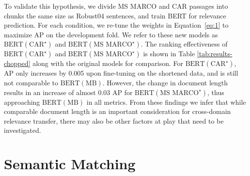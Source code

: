 To validate this hypothesis, we divide MS MARCO and CAR passages into chunks the same size as Robust04 sentences, and train BERT for relevance prediction.
For each condition, we re-tune the weights in Equation~\ref{eq:1} to maximize AP on the development fold.
We refer to these new models as $ \textrm{BERT}(\textrm{CAR}^{\star}) $ and $ \textrm{BERT}(\textrm{MS MARCO}^{\star}) $.
The ranking effectiveness of $ \textrm{BERT}(\textrm{CAR}^{\star}) $ and $ \textrm{BERT}(\textrm{MS MARCO}^{\star}) $ is shown in Table \ref{tab:results-chopped} along with the original models for comparison.
For $ \textrm{BERT}(\textrm{CAR}^{\star}) $, AP only increases by 0.005 upon fine-tuning on the shortened data, and is still not comparable to $ \textrm{BERT}(\textrm{MB}) $.
However, the change in document length results in an increase of almost 0.03 AP for $ \textrm{BERT}(\textrm{MS MARCO}^{\star}) $, thus approaching $ \textrm{BERT}(\textrm{MB}) $ in all metrics.
From these findings we infer that while comparable document length is an important consideration for cross-domain relevance transfer, there may also be other factors at play that need to be investigated.


\section{Semantic Matching}

\begin{table}[t!]
\centering{}
\caption{Retrieval effectiveness on pruned Robust04.}
\label{tab:results-pruned}
\end{table}

